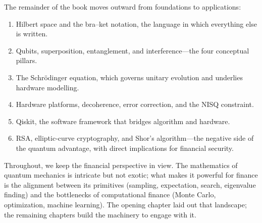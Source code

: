 The remainder of the book moves outward from foundations to applications:

\begin{enumerate}
\item Hilbert space and the bra--ket notation, the language in which everything else is written.
\item Qubits, superposition, entanglement, and interference---the four conceptual pillars.
\item The Schr\"odinger equation, which governs unitary evolution and underlies hardware modelling.
\item Hardware platforms, decoherence, error correction, and the NISQ constraint.
\item Qiskit, the software framework that bridges algorithm and hardware.
\item RSA, elliptic-curve cryptography, and Shor's algorithm---the negative side of the quantum advantage, with direct implications for financial security.
\end{enumerate}

Throughout, we keep the financial perspective in view. The mathematics of quantum mechanics is intricate but not exotic; what makes it powerful for finance is the alignment between its primitives (sampling, expectation, search, eigenvalue finding) and the bottlenecks of computational finance (Monte Carlo, optimization, machine learning). The opening chapter laid out that landscape; the remaining chapters build the machinery to engage with it.

\textsep
